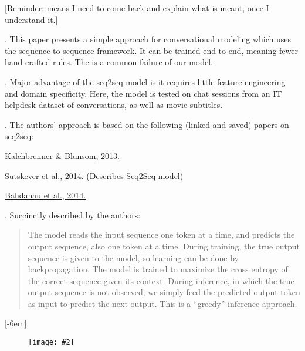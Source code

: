 \documentclass[11pt]{article}
\newcommand\myfig[2][0.3\textwidth]{\begin{figure}[h!]\centering\texttt{[image: \#2]}\end{figure}}
\newcommand\myspace[1][]{\vspace{#1\bigskipamount}}
\newcommand\p{\Needspace{10\baselineskip} \noindent}
\begin{document}
\vspace{-1em}
[{\scriptsize Reminder:  means I need to come back and explain what is meant, once I understand it.}]

\p {}. This paper presents a simple approach for conversational modeling which uses the sequence to sequence framework. It can be trained end-to-end, meaning fewer hand-crafted rules. The  is a common failure of our model. 

\myspace
\p {}. Major advantage of the seq2seq model is it requires little feature engineering and domain specificity. Here, the model is tested on chat sessions from an IT helpdesk dataset of conversations, as well as movie subtitles.

\myspace
\p {}. The authors' approach is based on the following (linked and saved) papers on seq2seq:
\begin{compactitem}
	\item \href{https://arxiv.org/pdf/1306.3584.pdf}{Kalchbrenner \& Blunsom, 2013.}
	\item \href{https://arxiv.org/pdf/1409.3215.pdf}{Sutskever et al., 2014.} (Describes Seq2Seq model)
	\item \href{https://arxiv.org/pdf/1409.0473.pdf}{Bahdanau et al., 2014.}
\end{compactitem}

\myspace
\p {}. Succinctly described by the authors:\vspace{-1em}
\begin{quote}
	The model reads the input sequence one token at a time, and predicts the output sequence, also one token at a time. During training, the true output sequence is given to the model, so learning can be done by backpropagation. The model is trained to maximize the cross entropy of the correct sequence given
	its context. During inference, in which the true output sequence is not observed, we simply feed the predicted output token as input to predict the next output. This is a “greedy” inference approach. 
\end{quote}
[-6em]
\myfig[0.8\textwidth]{Seq2SeqModel.PNG}
\end{document}
